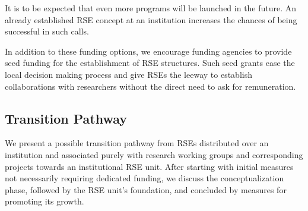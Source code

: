 \documentclass[a4paper]{article}
\begin{document}
\begin{enumerate}
      It is to be expected that even more programs will be launched in the future.
      An already established RSE concept at an institution increases the chances of being successful in such calls.
\end{enumerate}

In addition to these funding options, we encourage funding agencies to provide seed funding for the establishment of RSE structures.
Such seed grants ease the local decision making process and give RSEs the leeway to establish collaborations with researchers without the direct need to ask for remuneration.


\subsection{Transition Pathway}

We present a possible transition pathway from RSEs distributed over an institution and associated purely with research working groups and corresponding projects towards an institutional RSE unit.
After starting with initial measures not necessarily requiring dedicated funding, we discuss the conceptualization phase, followed by the RSE unit's foundation, and concluded by measures for promoting its growth.
\end{document}
